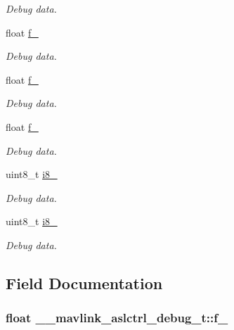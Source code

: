 \begin{DoxyCompactItemize}
\begin{DoxyCompactList}\small\item\em Debug data. \end{DoxyCompactList}\item 
float \hyperlink{struct____mavlink__aslctrl__debug__t_a25e43f9c2c83be64f2c484bd65d4ce8e}{f\+\_}
\begin{DoxyCompactList}\small\item\em Debug data. \end{DoxyCompactList}\item 
float \hyperlink{struct____mavlink__aslctrl__debug__t_a78fab329dd93eddaa6692cddde8aa691}{f\+\_}
\begin{DoxyCompactList}\small\item\em Debug data. \end{DoxyCompactList}\item 
float \hyperlink{struct____mavlink__aslctrl__debug__t_a19ad1d7584d5c10b4bff35968e7bc6f9}{f\+\_}
\begin{DoxyCompactList}\small\item\em Debug data. \end{DoxyCompactList}\item 
uint8\+\_\+t \hyperlink{struct____mavlink__aslctrl__debug__t_acc0bc2825b1055a3124b57d2bef65463}{i8\+\_}
\begin{DoxyCompactList}\small\item\em Debug data. \end{DoxyCompactList}\item 
uint8\+\_\+t \hyperlink{struct____mavlink__aslctrl__debug__t_a427da6303adbb1fc862a7013581e91f9}{i8\+\_}
\begin{DoxyCompactList}\small\item\em Debug data. \end{DoxyCompactList}\end{DoxyCompactItemize}


\subsection{Field Documentation}
\hypertarget{struct____mavlink__aslctrl__debug__t_a3d8a2e23c21d52835e3f0031d1ccfae8}{
\subsubsection[{f\+\_\+1}]{\setlength{\rightskip}{0pt plus 5cm}float \+\_\+\+\_\+mavlink\+\_\+aslctrl\+\_\+debug\+\_\+t\+::f\+\_}}\label{struct____mavlink__aslctrl__debug__t_a3d8a2e23c21d52835e3f0031d1ccfae8}


